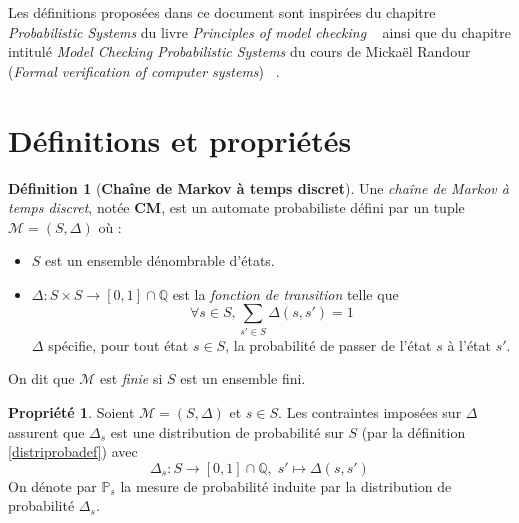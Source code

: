 \documentclass[12pt,a4paper]{report}
\theoremstyle{definition}%
\newtheorem{definition}{Définition}[chapter]
\newtheorem{propriete}{Propriété}[chapter]
\theoremstyle{remark}
\newcommand{\pr}{\mathbb{P}}
\let\labelitemi\labelitemii
\begin{document}
Les définitions proposées dans ce document sont inspirées du chapitre \textit{Probabilistic Systems} du livre \textit{Principles of model checking} ~\cite{DBLP:books/daglib/0020348} ainsi que du chapitre intitulé \textit{Model Checking Probabilistic Systems} du cours de Mickaël Randour (\textit{Formal verification of computer systems}) ~\cite{Course1}.

\section{Définitions et propriétés}

\theoremstyle{definition}
\begin{definition}[\textbf{Chaîne de Markov à temps discret}]

	Une \textit{chaîne de Markov à temps discret}, notée \textbf{CM}, est un automate probabiliste défini par un tuple  $\mathcal{M} = (S, \Delta)$ où :
	\begin{itemize}
		\renewcommand{\labelitemi}{\tiny$\bullet$}
		\item $S$ est un ensemble dénombrable d'états.
		\item $\Delta: S \times S \rightarrow [0,1] \cap \mathbb{Q}$ est la \textit{fonction de transition} telle que \[\forall s \in S, \sum_{s' \in S}\Delta(s, s')= 1\]
		$\Delta$ spécifie, pour tout état $s \in S$, la probabilité de passer de l'état $s$ à l'état $s'$.
	\end{itemize}
	On dit que $\mathcal{M}$ est \textit{finie} si $S$ est un ensemble fini.
\end{definition}

\begin{propriete} \label{distribmarkov}
	Soient $\mathcal{M} = (S, \Delta)$ et $s \in S$.
	Les contraintes imposées sur $\Delta$ assurent que $\Delta_s$ est une distribution de probabilité sur $S$  (par la définition \ref{distriprobadef}) avec \[\Delta_s : S \rightarrow [0, 1] \cap \mathbb{Q}, \; s' \mapsto \Delta(s, s')\] On dénote par $\pr_s$ la mesure de probabilité induite par la distribution de probabilité $\Delta_s$.%
\end{propriete}
\end{document}
